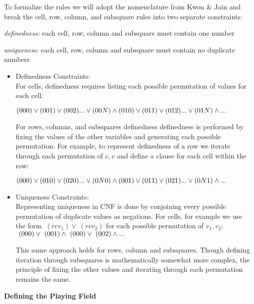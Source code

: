 \documentclass[11pt]{article}
\begin{document}
To formalize the rules we will adopt the nomenclature from Kwon \& Jain\cite{sudokusat} and break the cell, row, column, and subsquare rules into two separate constraints: 

\textit{definedness:} each cell, row, column and subsquare must contain one number

\textit{uniqueness:} each cell, row, column and subsquare must contain no duplicate numbers

\begin{itemize}

\item Definedness Constraints:\\
For cells, definedness requires listing each possible permutation of values for each cell: 

$
(000) \vee (001) \vee (002) ... \vee (00N) \wedge \\
(010) \vee (011) \vee (012) ... \vee (01N) \wedge \\
...
$

For rows, columns, and subsquares definedness definedness is performed by fixing the values of the other variables and generating each possible permutation. For example, to represent definedness of a row we iterate through each permutation of $c,v$ and define a clause for each cell within the row:

$
(000) \vee (010) \vee (020) ... \vee (0N0) \wedge \\
(001) \vee (011) \vee (021) ... \vee (0N1) \wedge \\
...
$


\item Uniqueness Constraints:\\
Representing uniqueness in CNF is done by conjoining every possible permutation of duplicate values as negations. 
For cells, for example we use the form $~(rcv_1) \vee ~(rcv_2)$ for each possible permutation of $v_1, v_2$:\\
$
~(000) \vee ~(001) \wedge \\
~(000) \vee ~(002) \wedge \\
...
$

This same approach holds for rows, column and subsquares. Though defining iteration through subsquares is mathematically somewhat more complex, the principle of fixing the other values and iterating through each permutation remains the same.

\end{itemize}

\textbf{Defining the Playing Field}
\end{document}
